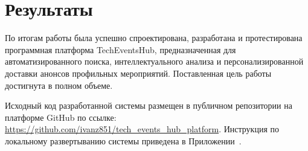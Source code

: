 \section*{Результаты}
По итогам работы была успешно спроектирована, разработана и протестирована программная платформа TechEventsHub, предназначенная для автоматизированного поиска, интеллектуального анализа и персонализированной доставки анонсов профильных мероприятий. 
Поставленная цель работы достигнута в полном объеме.

\vspace{1em}

Исходный код разработанной системы размещен в публичном репозитории на платформе GitHub по ссылке: \url{https://github.com/ivanz851/tech_events_hub_platform}.
Инструкция по локальному развертыванию системы приведена в Приложении~.

\vspace{1em}

